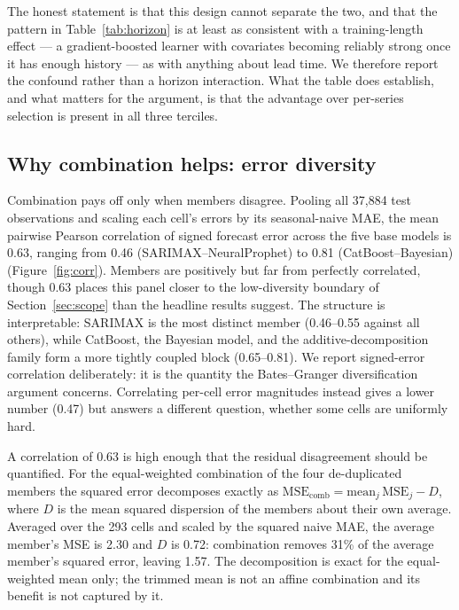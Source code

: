 \documentclass[11pt]{article}
\begin{document}
The honest statement is that this design cannot separate the two, and that the pattern in Table~\ref{tab:horizon} is at least as consistent with a training-length effect --- a gradient-boosted learner with covariates becoming reliably strong once it has enough history --- as with anything about lead time. We therefore report the confound rather than a horizon interaction. What the table does establish, and what matters for the argument, is that the advantage over per-series selection is present in all three terciles.

\subsection{Why combination helps: error diversity}
\label{sec:diversity}

Combination pays off only when members disagree. Pooling all 37,884 test observations and scaling each cell's errors by its seasonal-naive MAE, the mean pairwise Pearson correlation of signed forecast error across the five base models is 0.63, ranging from 0.46 (SARIMAX--NeuralProphet) to 0.81 (CatBoost--Bayesian) (Figure~\ref{fig:corr}). Members are positively but far from perfectly correlated, though 0.63 places this panel closer to the low-diversity boundary of Section~\ref{sec:scope} than the headline results suggest. The structure is interpretable: SARIMAX is the most distinct member (0.46--0.55 against all others), while CatBoost, the Bayesian model, and the additive-decomposition family form a more tightly coupled block (0.65--0.81). We report signed-error correlation deliberately: it is the quantity the Bates--Granger diversification argument concerns. Correlating per-cell error magnitudes instead gives a lower number (0.47) but answers a different question, whether some cells are uniformly hard.

A correlation of 0.63 is high enough that the residual disagreement should be quantified. For the equal-weighted combination of the four de-duplicated members the squared error decomposes exactly as $\mathrm{MSE}_{\text{comb}} = \mathrm{mean}_j\, \mathrm{MSE}_j - D$, where $D$ is the mean squared dispersion of the members about their own average. Averaged over the 293 cells and scaled by the squared naive MAE, the average member's MSE is 2.30 and $D$ is 0.72: combination removes 31\% of the average member's squared error, leaving 1.57. The decomposition is exact for the equal-weighted mean only; the trimmed mean is not an affine combination and its benefit is not captured by it.
\end{document}
